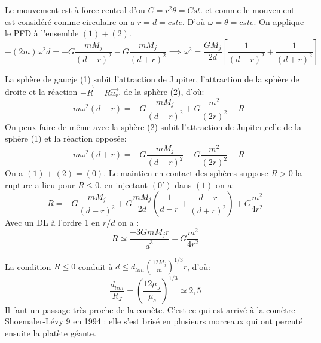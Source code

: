 \begin{Answer}
  \Question Le mouvement est à force central d'ou $C= r^2\dot{\theta} = Cst$. et comme le mouvement est considéré comme circulaire on a $r= d = cste$. D'où $ \omega = \dot{\theta}=cste$. On applique le PFD à l'ensemble $(1)+(2)$.
  \[
    -(2m)\omega^2d = -G \frac{mM_j}{(d-r)^2} - G \frac{mM_j}{(d+r)^2} \implies
    \omega^2 = \frac{GM_j}{2d} \left[
      \frac{1}{(d-r)^2} + \frac{1}{(d+r)^2}\right] \tag{(0')}
  \]

  \Question La sphère de gaucje (1) subit l'attraction de Jupiter, l'attraction de la sphère de droite et la réaction $-\overrightarrow{R} = R \vec{u_r}$. de la sphère (2), d'où:
\[
  -m \omega^2(d-r) = -G \frac{mM_j}{(d-r)^2}+ G \frac{m^2}{(2r)^2} - R \tag{(1)}
\]
On peux faire de même avec la sphère (2) subit l'attraction de Jupiter,celle de la sphère (1) et  la réaction opposée:
\[
-m \omega^2(d+r) = -G \frac{mM_j}{(d-r)^2}- G \frac{m^2}{(2r)^2} + R \tag{(2)}
\]
On a $(1)+(2) = (0) $.
\Question Le maintien en contact des sphères suppose $R>0$ la rupture  a lieu pour $R \le 0$. en injectant $(0')$ dans $(1)$ on a:
\[
  R = - G \frac{mM_j}{(d-r)^2}+G \frac{mM_j}{2d}\left(\frac{1}{d-r}+\frac{d-r}{(d+r)^2}\right) + G \frac{m^2}{4r^2}
\]
Avec un DL à l'ordre 1 en $r/d$ on a :
\[
  R\simeq \frac{-3GmM_jr}{d^3} +G \frac{m^2}{4r^2}
\]

La condition $R\le0$ conduit à $d\le d_{lim} \left(\frac{12M_j}{m}\right)^{1/3}r$, d'où:
\[
  \frac{d_{lim}}{R_J} = \left(\frac{12\mu_J}{\mu_c}\right)^{1/3} \simeq 2,5
\]
Il faut un passage très proche de la comète. C'est ce qui est arrivé à la comètre Shoemaler-Lévy 9 en 1994 : elle s'est brisé en plusieurs morceaux qui ont percuté ensuite la platète géante.
\end{Answer}
